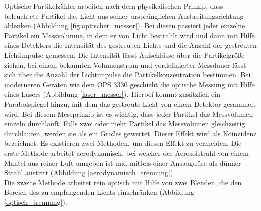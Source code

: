 Optische Partikelz\"{a}hler arbeiten nach dem physikalischen Prinzip, dass beleuchtete Partikel das Licht aus seiner urspr\"{u}nglichen Ausbreitungsrichtung ablenken (Abbildung \ref{fig:optischer_messer}). Bei diesen passiert jeder einzelne Partikel ein Messvolumne, in dem er von Licht bestrahlt wird und dann mit Hilfe eines Detektors die Intensit\"{a}t des gestreuten Lichts und die Anzahl der gestreuten Lichtimpulse gemessen. Die Intensit\"{a}t l\"{a}sst Aufschl\"{u}sse \"{u}ber die Partikelgr\"{o}{\ss}e ziehen, bei einem bekannten Volumenstrom und vordefinierter Messdauer l\"{a}sst sich \"{u}ber die Anzahl der Lichtimpulse die Partikelkonzentration bestimmen. Bei moderneren Ger\"{a}ten wie dem OPS 3330 geschieht die optische Messung mit Hilfe eines Lasers (Abbildung \ref{laser_messer}). Hierbei kommt zus\"{a}tzlich ein Parabolspiegel hinzu, mit dem das gestreute Licht von einem Detektor gesammelt wird. Bei diesem Messprinzip ist es wichtig, dass jeder Partikel das Messvolumen einzeln durchl\"{a}uft. Falls zwei oder mehr Partikel das Messvolumen gleichzeitig durchlaufen, werden sie als ein Gro{\ss}es gewertet. Dieser Effekt wird als Koinzidenz bezeichnet. Es existieren zwei Methoden, um diesen Effekt zu vermeiden. Die erste Methode arbeitet aerodynamisch, bei welcher der Aerosolstrahl von einem Mantel aus reiner Luft umgeben ist und mittels einer Ansaugd\"{u}se als d\"{u}nner Strahl austritt (Abbildung \ref{aerodynamisch_trennung}).\\
Die zweite Methode arbeitet rein optisch mit Hilfe von zwei Blenden, die den Bereich des zu empfangenden Lichts einschr\"{a}nken (Abbildung \ref{optisch_trennung}).

